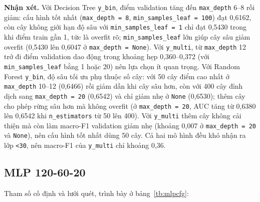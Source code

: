 \documentclass[a4paper]{report}
\begin{document}
\textbf{Nhận xét.} Với Decision Tree \texttt{y\_\allowbreak{}bin}, điểm validation tăng đến \texttt{max\_\allowbreak{}depth} 6–8 rồi giảm: cấu hình tốt nhất (\texttt{max\_\allowbreak{}depth = 8}, \texttt{min\_\allowbreak{}samples\_\allowbreak{}leaf = 100}) đạt 0,6162, còn cây không giới hạn độ sâu với \texttt{min\_\allowbreak{}samples\_\allowbreak{}leaf = 1} chỉ đạt 0,5430 trong khi điểm train gần 1, tức là overfit rõ; \texttt{min\_\allowbreak{}samples\_\allowbreak{}leaf} lớn giúp cây sâu giảm overfit (0,5430 lên 0,6047 ở \texttt{max\_\allowbreak{}depth = None}). Với \texttt{y\_\allowbreak{}multi}, từ \texttt{max\_\allowbreak{}depth} 12 trở đi điểm validation dao động trong khoảng hẹp 0,360–0,372 (với \texttt{min\_\allowbreak{}samples\_\allowbreak{}leaf} bằng 1 hoặc 20) nên lựa chọn ít quan trọng. Với Random Forest \texttt{y\_\allowbreak{}bin}, độ sâu tối ưu phụ thuộc số cây: với 50 cây điểm cao nhất ở \texttt{max\_\allowbreak{}depth} 10–12 (0,6466) rồi giảm dần khi cây sâu hơn, còn với 400 cây đỉnh dịch sang \texttt{max\_\allowbreak{}depth = 20} (0,6542) và chỉ giảm nhẹ ở \texttt{None} (0,6530); thêm cây cho phép rừng sâu hơn mà không overfit (ở \texttt{max\_\allowbreak{}depth = 20}, AUC tăng từ 0,6380 lên 0,6542 khi \texttt{n\_\allowbreak{}estimators} từ 50 lên 400). Với \texttt{y\_\allowbreak{}multi} thêm cây không cải thiện mà còn làm macro-F1 validation giảm nhẹ (khoảng 0,007 ở \texttt{max\_\allowbreak{}depth = 20} và \texttt{None}), nên cấu hình tốt nhất dùng 50 cây. Cả hai mô hình đều khó nhận ra lớp \texttt{<30}, nên macro-F1 của \texttt{y\_\allowbreak{}multi} chỉ khoảng 0,36.

\subsection{MLP 120-60-20}

Tham số cố định và lưới quét, trình bày ở bảng~\ref{tb:mlpcfg}:
\end{document}
